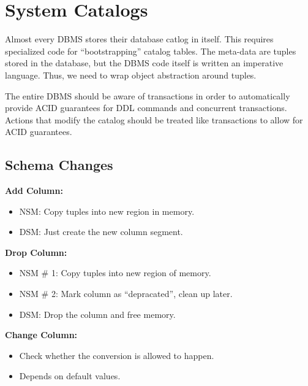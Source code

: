 \documentclass[11pt]{article}
\begin{document}
\maketitle
\thispagestyle{plain}

\section{System Catalogs}
Almost every DBMS stores their database catlog in itself. This requires specialized code for 
``bootstrapping'' catalog tables.
The meta-data are tuples stored in the database, but the DBMS code itself is written an imperative 
language. Thus, we need to wrap object abstraction around tuples.

The entire DBMS should be aware of transactions in order to automatically provide ACID 
guarantees for DDL commands and concurrent transactions.
Actions that modify the catalog should be treated like transactions to allow for ACID guarantees.

\subsection*{Schema Changes}

\textbf{Add Column:}
\begin{itemize}
    \item NSM:
    Copy tuples into new region in memory.
    
    \item DSM:
    Just create the new column segment.
\end{itemize}

\textbf{Drop Column:}
\begin{itemize}
    \item NSM \# 1: 
    Copy tuples into new region of memory.
    
    \item NSM \# 2: 
    Mark column as ``depracated'', clean up later.
    
    \item DSM:
    Drop the column and free memory.
\end{itemize}

\textbf{Change Column:}
\begin{itemize}
    \item
    Check whether the conversion is allowed to happen.
    
    \item
    Depends on default values.
\end{itemize}
\end{document}
